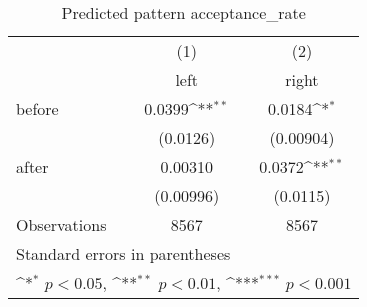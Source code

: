 \begin{table}[htbp]\centering
\def\sym#1{\ifmmode^{#1}\else\(^{#1}\)\fi}
\caption{Predicted pattern acceptance\_rate}
\begin{tabular}{l*{2}{c}}
\hline\hline
                    &\multicolumn{1}{c}{(1)}&\multicolumn{1}{c}{(2)}\\
                    &\multicolumn{1}{c}{left}&\multicolumn{1}{c}{right}\\
\hline
before              &      0.0399\sym{**} &      0.0184\sym{*}  \\
                    &    (0.0126)         &   (0.00904)         \\
[1em]
after               &     0.00310         &      0.0372\sym{**} \\
                    &   (0.00996)         &    (0.0115)         \\
\hline
Observations        &        8567         &        8567         \\
\hline\hline
\multicolumn{3}{l}{\footnotesize Standard errors in parentheses}\\
\multicolumn{3}{l}{\footnotesize \sym{*} \(p<0.05\), \sym{**} \(p<0.01\), \sym{***} \(p<0.001\)}\\
\end{tabular}
\end{table}
